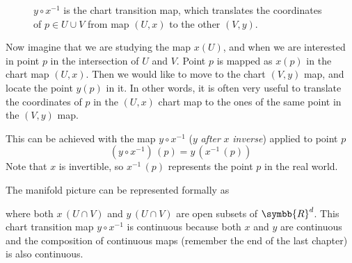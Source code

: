 \begin{figure}[ht]
  \caption{$y\circ x^{-1}$ is the chart transition map, which translates the coordinates of
    $p\in U\cup V$ from map $(U,x)$ to the other $(V,y)$.}
  \label{fig:mf-chart-transition-maps-one}
\end{figure}

Now imagine that we are studying the map $x(U)$, and when we are interested in point $p$ in the
intersection of $U$ and $V$. Point $p$ is mapped as $x(p)$ in the chart map $(U,x)$.
Then we would like to move to the chart $(V,y)$ map, and locate the point $y(p)$ in it.
In other words, it is often very useful to translate the coordinates of $p$ in the $(U,x)$
chart map to the ones of the same point in the $(V,y)$ map.

This can be achieved with the map $y\circ x^{-1}$ ($y$ \emph{after} $x$ \emph{inverse})
applied to point $p$
\[
  (y\circ x^{-1})\,(p) = y\, (x^{-1} \,(p))
\]
Note that $x$ is invertible\footnotemark{}, so $x^{-1}\,(p)$ represents the point $p$ in the
real world.

The manifold picture can be represented formally as
\vspace{-1ex}
\begin{center}
  \def\dist{.6}
\end{center}
where both $x\,(U\cap  V)$ and $y\,(U\cap V)$ are open subsets of $\symbb{R}^d$.
This chart transition map $y\circ x^{-1}$ is continuous because both $x$ and $y$ are
continuous and the composition of continuous maps (remember the end of the last chapter)
is also continuous.

